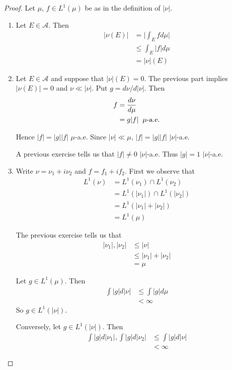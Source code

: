 \documentclass[12pt]{amsart}
\newcommand{\MA}{\mathcal{A}}
\begin{document}
\begin{proof}
	Let $\mu$, $f \in L^1(\mu)$ be as in the definition of $|\nu|$.
	\begin{enumerate}
		\item Let $E \in \MA$. Then 
		\begin{align*}
			|\nu(E)| 
			& = \bigg|\int_E f d\mu\bigg|\\
			& \leq \int_E |f| d\mu\\
			&= |\nu|(E)
		\end{align*}
		
		\item Let $E \in \MA$ and suppose that $|\nu|(E)=0$. The previous part implies $|\nu(E)|=0$ and $\nu \ll |\nu|$. Put $g = d \nu / d|\nu|$. Then 
		\begin{align*}
			f 
			&= \frac{d\nu}{d\mu}\\
			&= g|f| \hspace{2mm }\mu\text{-a.e.}
		\end{align*}
		
		Hence $|f| = |g||f|$ $\mu$-a.e. Since $|\nu| \ll \mu$, $|f| = |g||f|$ $|\nu|$-a.e.
		
		A previous exercise tells us that $|f| \neq 0$ $|\nu|$-a.e. Thus $|g|=1$ $|\nu|$-a.e.\\
		
		\item Write $\nu = \nu_1 + i\nu_2$ and $f = f_1 + if_2$. First we observe that
		\begin{align*}
			L^1(\nu)
			&= L^1(\nu_1) \cap L^1(\nu_2) \\
			&= L^1(|\nu_1|) \cap L^1(|\nu_2|)\\
			&= L^1(|\nu_1| + |\nu_2|)\\
			&= L^1(\mu)
		\end{align*}
		
		The previous exercise tells us that 
		\begin{align*}
			|\nu_1|, |\nu_2| 
			&\leq |\nu| \\
			&\leq |\nu_1|+ |\nu_2| \\
			&= \mu
		\end{align*}
		
		Let $g \in L^1(\mu)$. Then 
		\begin{align*}
			\int |g| d |\nu| 
			&\leq \int |g| d \mu \\
			&< \infty
		\end{align*}
		So $g \in L^1(|\nu|)$.
		
		Conversely, let $g \in L^1(|\nu|)$. Then 
		\begin{align*}
			\int |g| d|\nu_1|, \int |g| d |\nu_2| 
			& \leq \int |g|d |\nu|\\
			& < \infty
		\end{align*}
		

\end{enumerate}
\end{proof}
\end{document}
